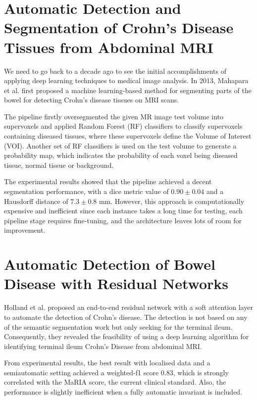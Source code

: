 \section{Automatic Detection and Segmentation of Crohn's Disease Tissues from Abdominal MRI}

We need to go back to a decade ago to see the initial accomplishments of applying deep learning techniques to medical image analysis. In 2013, Mahapara et al. \cite{mahapatra2013automatic} first proposed a machine learning-based method for segmenting parts of the bowel for detecting Crohn's disease tissues on MRI scans. \medskip

\noindent The pipeline firstly oversegmented the given MR image test volume into supervoxels and applied Random Forest (RF) classifiers to classify supervoxels containing diseased tissues, where these supervoxels define the Volume of Interest (VOI). Another set of RF classifiers is used on the test volume to generate a probability map, which indicates the probability of each voxel being diseased tissue, normal tissue or background. \medskip

\noindent The experimental results showed that the pipeline achieved a decent segmentation performance, with a dice metric value of \(0.90 \pm 0.04\) and a Hausdorff distance of \(7.3 \pm 0.8\) mm. However, this approach is computationally expensive and inefficient since each instance takes a long time for testing, each pipeline stage requires fine-tuning, and the architecture leaves lots of room for improvement.

\section{Automatic Detection of Bowel Disease with Residual Networks}
Holland et al. \cite{holland2019automatic} proposed an end-to-end residual network \cite{he2016deep} with a soft attention layer \cite{schlemper2019attention} to automate the detection of Crohn's disease. The detection is not based on any of the semantic segmentation work but only seeking for the terminal ileum. Consequently, they revealed the feasibility of using a deep learning algorithm for identifying terminal ileum Crohn's Disease from abdominal MRI. \medskip

\noindent From experimental results, the best result with localised data and a semiautomatic setting achieved a weighted-f1 score \(0.83\), which is strongly correlated with the MaRIA \cite{rimola2009magnetic} score, the current clinical standard. Also, the performance is slightly inefficient when a fully automatic invariant is included. \medskip

